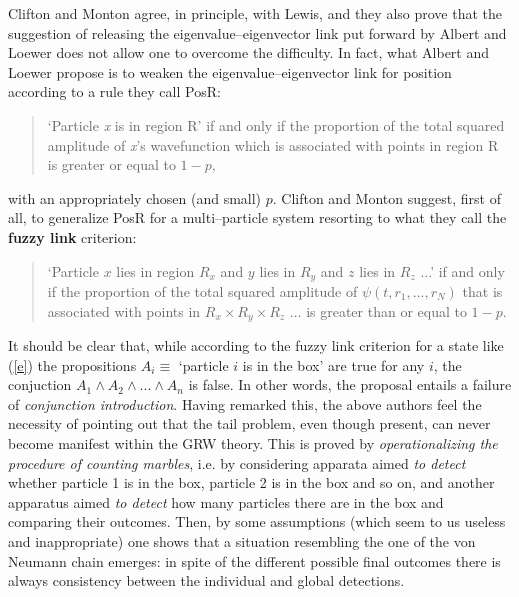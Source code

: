 \documentclass[12pt]{article}
\begin{document}
Clifton and Monton \cite{cli1} agree, in principle, with Lewis,
and they also prove that the suggestion of releasing the
eigenvalue--eigenvector link put forward by Albert and Loewer
\cite{alo1} does not allow one to overcome the difficulty. In
fact, what Albert and Loewer propose is to weaken the
eigenvalue--eigenvector link for position according to a rule they
call PosR:
\begin{quotation}
`Particle {\it x} is in region R' if and only if the proportion of
the total squared amplitude of {\it x}'s wavefunction which is
associated with points in region R is greater or equal to $1-p,$
\end{quotation}
with an appropriately chosen (and small) $p$. Clifton and Monton
suggest, first of all, to generalize PosR for a multi--particle
system resorting to what they call the {\bf fuzzy link} criterion:
\begin{quotation}
`Particle $x$ lies in region $R_{x}$ and $y$ lies in $R_{y}$ and
$z$ lies in $R_{z}$ ...' if and only if the proportion of the
total squared amplitude of $\psi (t,r_{1},...,r_{N})$ that is
associated with points in $R_{x}\times R_{y} \times R_{z}$ ... is
greater than or equal to $1-p$.
\end{quotation}

It should be clear that, while according to the fuzzy link criterion for a
state like (\ref{e}) the propositions $A_{i}\equiv $ `particle $i$
is in the box' are true for any $i$, the conjuction $A_{1}\wedge
A_{2}\wedge ...\wedge A_{n}$ is false. In other words, the
proposal entails a failure of {\it conjunction introduction}.
Having remarked this, the above authors feel the necessity of
pointing out that the tail problem, even though present, can never
become manifest within the GRW theory. This is proved by {\it
operationalizing the procedure of counting marbles}, i.e. by
considering apparata aimed {\it to detect} whether particle 1 is
in the box, particle 2 is in the box and so on, and another
apparatus aimed {\it to detect} how many particles there are in
the box and comparing their outcomes. Then, by some assumptions
(which seem to us useless and inappropriate) one shows that a
situation resembling the one of the von Neumann chain emerges: in
spite of the different possible final outcomes there is always
consistency between the individual and global detections.
\end{document}
